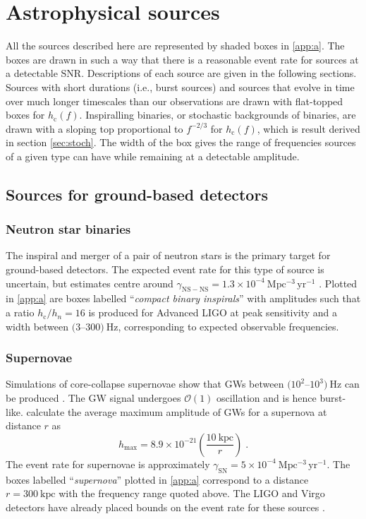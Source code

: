 \section{Astrophysical sources}\label{sec:sources}

All the sources described here are represented by shaded boxes in \ref{app:a}. The boxes are drawn in such a way that there is a reasonable event rate for sources at a detectable SNR. Descriptions of each source are given in the following sections. Sources with short durations (i.e., burst sources) and sources that evolve in time over much longer timescales than our observations are drawn with flat-topped boxes for $h_\mathrm{c}(f)$. Inspiralling binaries, or stochastic backgrounds of binaries, are drawn with a sloping top proportional to $f^{-2/3}$ for $h_\mathrm{c}(f)$, which is result derived in section \ref{sec:stoch}. The width of the box gives the range of frequencies sources of a given type can have while remaining at a detectable amplitude.

\subsection{Sources for ground-based detectors}

\subsubsection{Neutron star binaries}

The inspiral and merger of a pair of neutron stars is the primary target for ground-based detectors. The expected event rate for this type of source is uncertain, but estimates centre around $\gamma_{\mathrm{NS-NS}}=1.3\times 10^{-4}~\mathrm{Mpc^{-3}\,yr^{-1}}$ \citep{CBC}. Plotted in \ref{app:a} are boxes labelled ``\emph{compact binary inspirals}'' with amplitudes such that a ratio $h_\mathrm{c}/h_{n}=16$ is produced for Advanced LIGO at peak sensitivity and a width between $(3$--$300)~\mathrm{Hz}$, corresponding to expected observable frequencies.

\subsubsection{Supernovae}

Simulations of core-collapse supernovae show that GWs between $(10^{2}$--$10^{3})~\mathrm{Hz}$ can be produced \citep{Kotake2006}. The GW signal undergoes ${\mathcal{O}}(1)$ oscillation and is hence burst-like. \citet{2002A&A...393..523D} calculate the average maximum amplitude of GWs for a supernova at distance $r$ as
\begin{equation}
h_\mathrm{max} = 8.9\times 10^{-21}\left( \frac{10~\mathrm{kpc}}{r} \right) \; .
\end{equation}
The event rate for supernovae is approximately $\gamma_{\mathrm{SN}} = 5\times10^{-4}~\mathrm{Mpc^{-3}\,yr^{-1}}$. The boxes labelled ``\emph{supernova}'' plotted in \ref{app:a} correspond to a distance $r=300~\mathrm{kpc}$ with the frequency range quoted above. The LIGO and Virgo detectors have already placed bounds on the event rate for these sources \citep{Bursts}.

